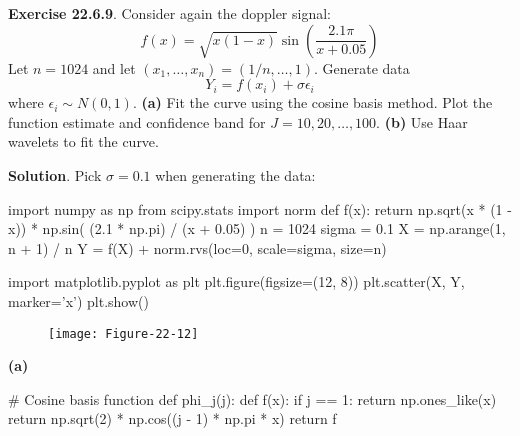 \textbf{Exercise 22.6.9}. Consider again the doppler signal:
\[
f(x) = \sqrt{x (1 - x)} \sin \left( \frac{2.1 \pi}{x + 0.05} \right)
\]
Let \(n = 1024\) and let \((x_{1}, \dots, x_{n}) = (1/n, \dots, 1)\).
Generate data
\[
Y_{i} = f(x_{i}) + \sigma \epsilon_{i}
\]
where \(\epsilon_{i} \sim N(0, 1)\).
\textbf{(a)} Fit the curve using the cosine basis method. Plot the
function estimate and confidence band for \(J = 10, 20, \dots, 100\).
\textbf{(b)} Use Haar wavelets to fit the curve.

\textbf{Solution}. Pick \(\sigma = 0.1\) when generating the data:

\begin{python}
import numpy as np
from scipy.stats import norm
def f(x):
    return np.sqrt(x * (1 - x)) * np.sin( (2.1 * np.pi) / (x + 0.05) )
n = 1024
sigma = 0.1
X = np.arange(1, n + 1) / n
Y = f(X) + norm.rvs(loc=0, scale=sigma, size=n)
\end{python}

\begin{python}
import matplotlib.pyplot as plt
plt.figure(figsize=(12, 8))
plt.scatter(X, Y, marker='x')
plt.show()
\end{python}

\begin{figure}[H]
\centering
\texttt{[image: Figure-22-12]}
\end{figure}

\textbf{(a)}

\begin{python}
# Cosine basis function
def phi_{j}(j):
    def f(x):
        if j == 1:
            return np.ones_like(x)
        return np.sqrt(2) * np.cos((j - 1) * np.pi * x)
    return f
\end{python}


